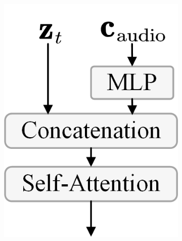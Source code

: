 \begin{figure}[t!]
\begin{minipage}[b]{0.65\textwidth}
    \end{minipage}
    \hfill
    \begin{minipage}[b]{0.32\textwidth} %
        \centering
        \begin{minipage}[b]{\textwidth} %
                \centering
                \begin{subfigure}{0.3\linewidth} %
                    \centering
                    \includegraphics[width=\linewidth]{figs/AudioCondition/Audio_SA.png} 
                    \caption{}  
                    \label{fig:AudioConditionSA}  
                \end{subfigure}%
                \hfill
                \begin{subfigure}{0.3\linewidth} %
                    \centering

\end{subfigure}
\end{minipage}
\end{minipage}
\end{figure}
